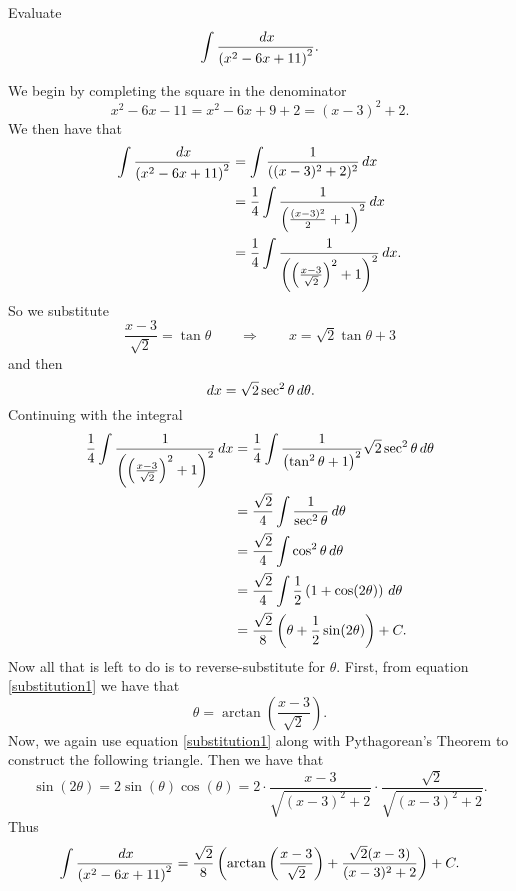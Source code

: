 \documentclass[]{ximera}
\begin{document}
\begin{problem}
\end{problem}

\begin{instructorNotes}

\end{instructorNotes}







\begin{problem}
Evaluate
	\[
	\int \frac{\,d x}{\left( x^2 - 6x + 11 \right)^2}.
	\]
	\begin{freeResponse}
	We begin by completing the square in the denominator
		\[
		x^2 - 6x - 11 = x^2 - 6x + 9 + 2 = (x-3)^2 + 2.
		\]
	We then have that
		\begin{align*}
		\int \frac{\,d x}{\left( x^2 - 6x + 11 \right)^2} 
		&= \int \frac{1}{((x-3)^2 + 2)^2} \,d x  \\
		&= \frac{1}{4} \int \frac{1}{\left( \frac{(x-3)^2}{2} + 1 \right)^2} \,d x  \\
		&= \frac{1}{4} \int \frac{1}{\left( \left( \frac{x-3}{\sqrt{2}} \right)^2 + 1 \right)^2} \,d x.
		\end{align*}
	So we substitute
		\begin{equation}\label{substitution1}
		\frac{x-3}{\sqrt{2}} = \tan \theta	\qquad	\Longrightarrow	\qquad	x = \sqrt{2} \tan \theta + 3
		\end{equation}
	and then
		\[
		\,d x = \sqrt{2} \sec^2 \theta \,d \theta.
		\]
	Continuing with the integral
		\begin{align*}
		\frac{1}{4} \int \frac{1}{\left( \left( \frac{x-3}{\sqrt{2}} \right)^2 + 1 \right)^2} \,d x
		&= \frac{1}{4} \int \frac{1}{\left( \tan^2 \theta + 1 \right)^2} \sqrt{2} \sec^2 \theta \,d \theta  \\
		&= \frac{\sqrt{2}}{4} \int \frac{1}{\sec^2 \theta} \,d \theta  \\
		&= \frac{\sqrt{2}}{4} \int \cos^2 \theta \,d \theta  \\
		&= \frac{\sqrt{2}}{4} \int \frac{1}{2} \left( 1 + \cos(2\theta) \right) \,d \theta  \\
		&= \frac{\sqrt{2}}{8} \left( \theta + \frac{1}{2} \sin(2\theta) \right) + C .
		\end{align*}
	Now all that is left to do is to reverse-substitute for $\theta$.  
	First, from equation \eqref{substitution1} we have that
		\[
		\theta = \arctan \left( \frac{x-3}{\sqrt{2}} \right).
		\]
	Now, we again use equation \eqref{substitution1} along with Pythagorean's Theorem to construct the following triangle.
	Then we have that
		\[
		\sin(2\theta) = 2 \sin(\theta) \cos(\theta) = 2 \cdot \frac{x-3}{\sqrt{(x-3)^2+2}} \cdot \frac{\sqrt{2}}{\sqrt{(x-3)^2+2}}.
		\]
	Thus
		\[
		\int \frac{\,d x}{\left( x^2 - 6x + 11 \right)^2} = \frac{\sqrt{2}}{8} \left( \arctan \left( \frac{x-3}{\sqrt{2}} \right) + \frac{\sqrt{2}(x-3)}{(x-3)^2+2} \right) + C .
		\]
	\end{freeResponse}
		
\end{problem}
\end{document}
